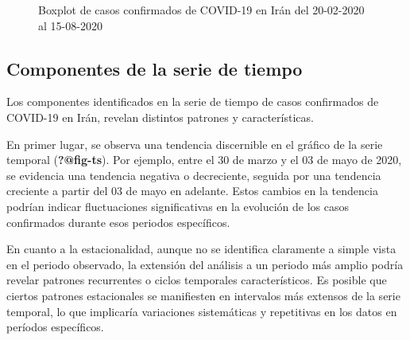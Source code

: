 \documentclass[
  us-letterpaper,
]{scrreprt}
\theoremstyle{plain}
\theoremstyle{definition}
\theoremstyle{plain}
\theoremstyle{definition}
\theoremstyle{remark}
\begin{document}
\begin{figure}


\caption{\label{fig-box}Boxplot de casos confirmados de COVID-19 en Irán
del 20-02-2020 al 15-08-2020}

\end{figure}%

\subsection{Componentes de la serie de
tiempo}\label{componentes-de-la-serie-de-tiempo}

Los componentes identificados en la serie de tiempo de casos confirmados
de COVID-19 en Irán, revelan distintos patrones y características.

En primer lugar, se observa una tendencia discernible en el gráfico de
la serie temporal (\textbf{?@fig-ts}). Por ejemplo, entre el 30 de marzo
y el 03 de mayo de 2020, se evidencia una tendencia negativa o
decreciente, seguida por una tendencia creciente a partir del 03 de mayo
en adelante. Estos cambios en la tendencia podrían indicar fluctuaciones
significativas en la evolución de los casos confirmados durante esos
periodos específicos.

En cuanto a la estacionalidad, aunque no se identifica claramente a
simple vista en el periodo observado, la extensión del análisis a un
periodo más amplio podría revelar patrones recurrentes o ciclos
temporales característicos. Es posible que ciertos patrones estacionales
se manifiesten en intervalos más extensos de la serie temporal, lo que
implicaría variaciones sistemáticas y repetitivas en los datos en
períodos específicos.
\end{document}
